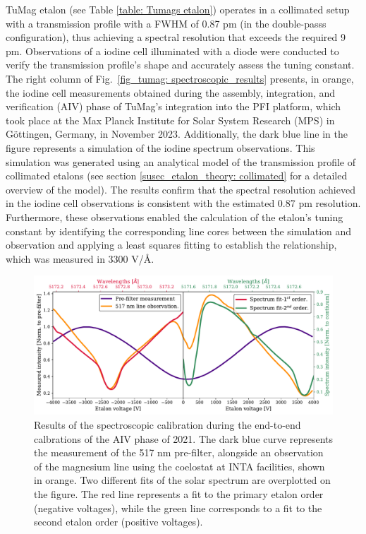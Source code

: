 TuMag etalon (see Table \ref{table: Tumags etalon}) operates in a collimated setup with a transmission profile with a FWHM of 0.87 pm (in the double-passs configuration), thus achieving a spectral resolution that exceeds the required 9 pm. Observations of a iodine cell illuminated with a diode were conducted to verify the transmission profile's shape and accurately assess the tuning constant. The right column of Fig.~\ref{fig_tumag: spectroscopic_results} presents, in orange, the iodine cell measurements obtained during the assembly, integration, and verification (AIV) phase of TuMag's integration into the PFI platform, which took place at the Max Planck Institute for Solar System Research (MPS) in Göttingen, Germany, in November 2023. Additionally, the dark blue line in the figure represents a simulation of the iodine spectrum observations. This simulation was generated using an analytical model of the transmission profile of collimated etalons (see section \ref{susec_etalon_theory: collimated} for a detailed overview of the model). The results confirm that the spectral resolution achieved in the iodine cell observations is consistent with the estimated 0.87 pm resolution. Furthermore, these observations enabled the calculation of the etalon's tuning constant by identifying the corresponding line cores between the simulation and observation and applying a least squares fitting to establish the relationship, which was measured in 3300 V/\r{A}.

\begin{figure}[t]
    \includegraphics[width=\textwidth]{figures/TuMag/secondorder.pdf}
    \caption[Etalon's second order in magnesium measurements.]{
      Results of the spectroscopic calibration during the end-to-end calbrations of the AIV phase of 2021. The dark blue curve represents the measurement of the 517 nm pre-filter, alongside an observation of the magnesium line using the coelostat at INTA facilities, shown in orange. Two different fits of the solar spectrum are overplotted on the figure. The red line represents a fit to the primary etalon order (negative voltages), while the green line corresponds to a fit to the second etalon order (positive voltages).      
      \label{fig_tumag:second-order_cont}}
\end{figure}

